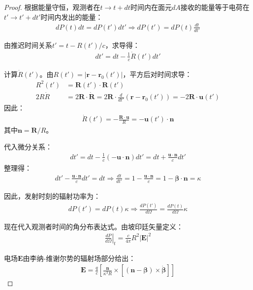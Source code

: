 \begin{proof}
根据能量守恒，观测者在$t \to t+dt$时间内在面元$dA$接收的能量等于电荷在$t' \to t'+dt'$时间内发出的能量：
\begin{align}
dP(t)dt = dP(t')dt' \Rightarrow dP(t') = dP(t)\frac{dt}{dt'}
\end{align}

由推迟时间关系$t' = t - R(t')/c$，求导得：
\begin{align}
dt' = dt - \frac{1}{c}\dot{R}(t')dt'
\end{align}

计算$\dot{R}(t')$。由$R(t') = |\mathbf{r} - \mathbf{r}_0(t')|$，平方后对时间求导：
\begin{align}
R^2(t') &= \mathbf{R}(t') \cdot \mathbf{R}(t') \\
2R\dot{R} &= 2\mathbf{R} \cdot \dot{\mathbf{R}} = 2\mathbf{R} \cdot \frac{d}{dt'}(\mathbf{r} - \mathbf{r}_0(t')) = -2\mathbf{R} \cdot \mathbf{u}(t')
\end{align}
因此：
\begin{align}
\dot{R}(t') = -\frac{\mathbf{R} \cdot \mathbf{u}}{R} = -\mathbf{u}(t') \cdot \mathbf{n}
\end{align}
其中$\mathbf{n} = \mathbf{R}/R$。

代入微分关系：
\begin{align}
dt' = dt - \frac{1}{c}(-\mathbf{u} \cdot \mathbf{n})dt' = dt + \frac{\mathbf{u} \cdot \mathbf{n}}{c}dt'
\end{align}
整理得：
\begin{align}
dt' - \frac{\mathbf{u} \cdot \mathbf{n}}{c}dt' = dt \Rightarrow \frac{dt}{dt'} = 1 - \frac{\mathbf{u} \cdot \mathbf{n}}{c} = 1 - \boldsymbol{\beta} \cdot \mathbf{n} = \kappa
\end{align}

因此，发射时刻的辐射功率为：
\begin{align}
dP(t') = dP(t) \kappa \Rightarrow \frac{dP(t')}{d\Omega} = \frac{dP(t)}{d\Omega} \kappa
\end{align}

现在代入观测者时间的角分布表达式。由坡印廷矢量定义：
\begin{align}
\left.\frac{dP}{d\Omega}\right|_t = \frac{c}{4\pi} R^2|\mathbf{E}|^2
\end{align}

电场$\mathbf{E}$由李纳-维谢尔势的辐射场部分给出：
\begin{align}
\mathbf{E} = \frac{q}{c} \left[ \frac{\mathbf{n}}{\kappa^3 R} \times [(\mathbf{n}-\boldsymbol{\beta}) \times \dot{\boldsymbol{\beta}}] \right]
\end{align}


\end{proof}
